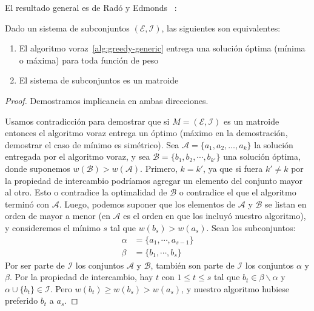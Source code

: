   El resultado general es de Radó y Edmonds~%
    \cite{edmonds71:_matroid_greed_algor}:
  \begin{theorem}
    \label{theo:greedy-matroid}
    Dado un sistema de subconjuntos \((\mathscr{E}, \mathscr{I})\),
    las siguientes son equivalentes:
    \begin{enumerate}
    \item
      El algoritmo voraz~\ref{alg:greedy-generic}
      entrega una solución óptima
      (mínima o máxima)
      para toda función de peso
    \item
      El sistema de subconjuntos es un matroide
    \end{enumerate}
  \end{theorem}
  \begin{proof}
    Demostramos implicancia en ambas direcciones.

    Usamos contradicción para demostrar
    que si \(M= (\mathscr{E}, \mathscr{I})\) es un matroide
    entonces el algoritmo voraz entrega un óptimo
    (máximo en la demostración,
     demostrar el caso de mínimo es simétrico).
    Sea \(\mathscr{A} = \{ a_1, a_2, \dotsc, a_k \}\)
    la solución entregada por el algoritmo voraz,
    y sea \(\mathscr{B} = \{ b_1, b_2, \cdots, b_{k'} \}\) una solución óptima,
    donde suponemos \(w(\mathscr{B}) > w(\mathscr{A})\).
    Primero,
    \(k = k'\),
    ya que si fuera \(k' \ne k\) por la propiedad de intercambio
    podríamos agregar un elemento del conjunto mayor al otro.
    Esto o contradice la optimalidad de \(\mathscr{B}\)
    o contradice el que el algoritmo terminó con \(\mathscr{A}\).
    Luego,
    podemos suponer que los elementos de \(\mathscr{A}\) y \(\mathscr{B}\)
    se listan en orden de mayor a menor
    (en \(\mathscr{A}\) es el orden en que los incluyó nuestro algoritmo),
    y consideremos el mínimo \(s\) tal que \(w(b_s) > w(a_s)\).
    Sean los subconjuntos:
    \begin{align*}
      \alpha
        &= \{ a_1, \cdots, a_{s - 1} \} \\
      \beta
        &= \{ b_1, \cdots, b_s \}
    \end{align*}
    Por ser parte de \(\mathscr{I}\)
    los conjuntos \(\mathscr{A}\) y \(\mathscr{B}\),
    también son parte de \(\mathscr{I}\) los conjuntos \(\alpha\) y \(\beta\).
    Por la propiedad de intercambio,
    hay \(t\) con \(1 \le t \le s\)
    tal que \(b_t \in \beta \smallsetminus \alpha\)
    y \(\alpha \cup \{ b_t \} \in \mathscr{I}\).
    Pero \(w(b_t) \ge w(b_s) > w(a_s)\),
    y nuestro algoritmo hubiese preferido \(b_t\) a \(a_s\).


\end{proof}
